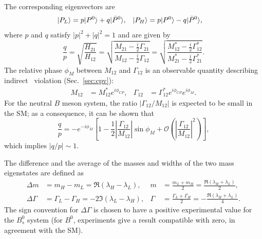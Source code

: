 The corresponding eigenvectors are
\begin{align}
	\label{eq:eigenvectors}
	|P_L\rangle &= p|P^0\rangle + q|\bar P^0\rangle, & |P_H\rangle &= p|P^0\rangle - q|\bar P^0\rangle,	
\end{align}
where $p$ and $q$ satisfy $|p|^2+|q|^2 = 1$ and are given by
\begin{equation}
	\frac{q}{p} = \sqrt{ \frac{H_{21}}{H_{12}} } = 
			\sqrt{ \frac{M_{21}-\frac{i}{2}\Gamma_{21}}{M_{12}-\frac{i}{2}\Gamma_{12}} } =
			 \sqrt{ \frac{M^*_{12}-\frac{i}{2}\Gamma^*_{12}}{M^*_{21}-\frac{i}{2}\Gamma^*_{21}} }.  
\end{equation}
The relative phase $\phi_M$ between $M_{12}$ and $\Gamma_{12}$ is an observable quantity describing indirect \CP~violation (Sec.~\ref{sec:cpv}):
\begin{align}
	M_{12} &= M_{12}^*e^{i\phi_{CP}}, & \Gamma_{12} &= \Gamma_{12}^*e^{i\phi_{CP}}e^{i\phi_M}.
\end{align}
For the neutral $B$ meson system, the ratio $|\Gamma_{12}/M_{12}|$ is expected to be small in the SM; as a consequence, it can be shown that
\begin{equation}
	\label{eq:pqratio}
	\frac{q}{p} = -e^{-i\phi_M} \left[1-\frac{1}{2}\left|\frac{\Gamma_{12}}{M_{12}}\right|\sin\phi_M + \mathcal O\left( \left|\frac{\Gamma_{12}}{M_{12}}\right|^2 \right) \right],
\end{equation}
which implies $|q/p|\sim1$.

The difference and the average of the masses and widths of the two mass eigenstates are defined as
\begin{align}
	\label{eq:deltaM}
	\Delta m &= m_H - m_L = \Re(\lambda_H - \lambda_L), & m &= \frac{m_L+m_H}{2} = \frac{\Re(\lambda_H + \lambda_L)}{2}, \\
	\label{eq:deltaGamma}
	\Delta\Gamma &= \Gamma_L - \Gamma_H = -2\Im(\lambda_L - \lambda_H), & \Gamma &= \frac{\Gamma_L+\Gamma_H}{2} = -\frac{\Re(\lambda_H + \lambda_L)}{4}. 
\end{align}
The sign convention for $\Delta\Gamma$ is chosen to have a positive experimental value for the $B^0_s$ system (for $B^0$, experiments give a result compatible with zero, in agreement with the SM).

